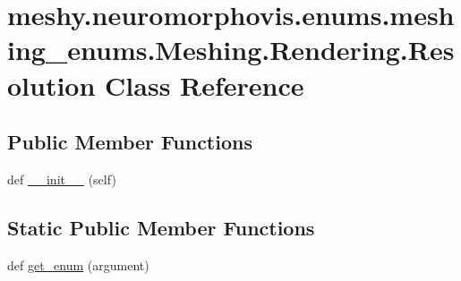 \hypertarget{classmeshy_1_1neuromorphovis_1_1enums_1_1meshing__enums_1_1Meshing_1_1Rendering_1_1Resolution}{}\section{meshy.\+neuromorphovis.\+enums.\+meshing\+\_\+enums.\+Meshing.\+Rendering.\+Resolution Class Reference}
\label{classmeshy_1_1neuromorphovis_1_1enums_1_1meshing__enums_1_1Meshing_1_1Rendering_1_1Resolution}


 


\subsection*{Public Member Functions}
\begin{DoxyCompactItemize}
\item 
def \hyperlink{classmeshy_1_1neuromorphovis_1_1enums_1_1meshing__enums_1_1Meshing_1_1Rendering_1_1Resolution_a80a7b18b009e60620279654c288a3ed5}{\+\_\+\+\_\+init\+\_\+\+\_\+} (self)\hypertarget{classmeshy_1_1neuromorphovis_1_1enums_1_1meshing__enums_1_1Meshing_1_1Rendering_1_1Resolution_a80a7b18b009e60620279654c288a3ed5}{}\label{classmeshy_1_1neuromorphovis_1_1enums_1_1meshing__enums_1_1Meshing_1_1Rendering_1_1Resolution_a80a7b18b009e60620279654c288a3ed5}

\end{DoxyCompactItemize}
\subsection*{Static Public Member Functions}
\begin{DoxyCompactItemize}
\item 
def \hyperlink{classmeshy_1_1neuromorphovis_1_1enums_1_1meshing__enums_1_1Meshing_1_1Rendering_1_1Resolution_afb36c11bdcc637d4cb0bb35b03719a9f}{get\+\_\+enum} (argument)\hypertarget{classmeshy_1_1neuromorphovis_1_1enums_1_1meshing__enums_1_1Meshing_1_1Rendering_1_1Resolution_afb36c11bdcc637d4cb0bb35b03719a9f}{}\label{classmeshy_1_1neuromorphovis_1_1enums_1_1meshing__enums_1_1Meshing_1_1Rendering_1_1Resolution_afb36c11bdcc637d4cb0bb35b03719a9f}

\end{DoxyCompactItemize}

